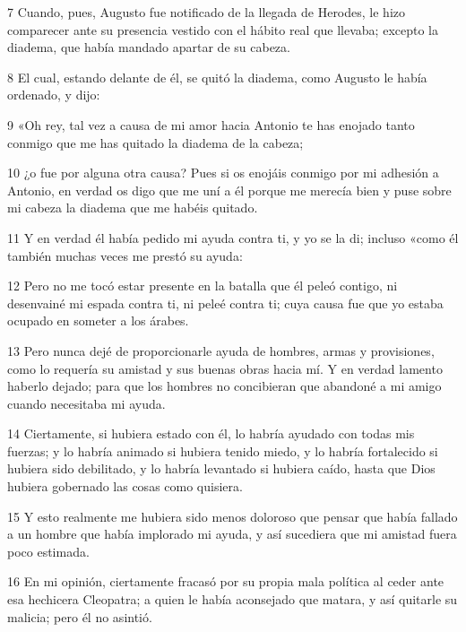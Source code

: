 \par 7 Cuando, pues, Augusto fue notificado de la llegada de Herodes, le hizo comparecer ante su presencia vestido con el hábito real que llevaba; excepto la diadema, que había mandado apartar de su cabeza.

\par 8 El cual, estando delante de él, se quitó la diadema, como Augusto le había ordenado, y dijo:

\par 9 «Oh rey, tal vez a causa de mi amor hacia Antonio te has enojado tanto conmigo que me has quitado la diadema de la cabeza;

\par 10 ¿o fue por alguna otra causa? Pues si os enojáis conmigo por mi adhesión a Antonio, en verdad os digo que me uní a él porque me merecía bien y puse sobre mi cabeza la diadema que me habéis quitado.

\par 11 Y en verdad él había pedido mi ayuda contra ti, y yo se la di; incluso «como él también muchas veces me prestó su ayuda:

\par 12 Pero no me tocó estar presente en la batalla que él peleó contigo, ni desenvainé mi espada contra ti, ni peleé contra ti; cuya causa fue que yo estaba ocupado en someter a los árabes.

\par 13 Pero nunca dejé de proporcionarle ayuda de hombres, armas y provisiones, como lo requería su amistad y sus buenas obras hacia mí. Y en verdad lamento haberlo dejado; para que los hombres no concibieran que abandoné a mi amigo cuando necesitaba mi ayuda.

\par 14 Ciertamente, si hubiera estado con él, lo habría ayudado con todas mis fuerzas; y lo habría animado si hubiera tenido miedo, y lo habría fortalecido si hubiera sido debilitado, y lo habría levantado si hubiera caído, hasta que Dios hubiera gobernado las cosas como quisiera.

\par 15 Y esto realmente me hubiera sido menos doloroso que pensar que había fallado a un hombre que había implorado mi ayuda, y así sucediera que mi amistad fuera poco estimada.

\par 16 En mi opinión, ciertamente fracasó por su propia mala política al ceder ante esa hechicera Cleopatra; a quien le había aconsejado que matara, y así quitarle su malicia; pero él no asintió.

